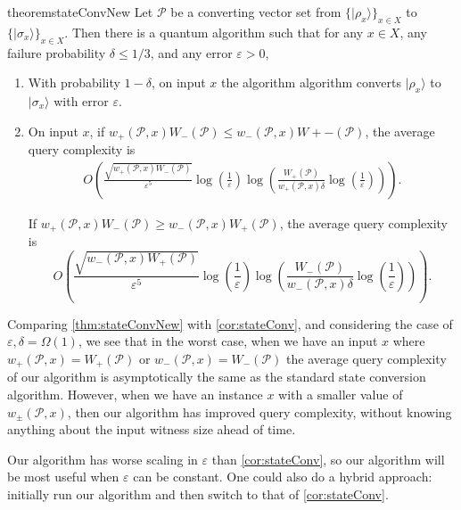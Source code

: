 \documentclass[cleveref, autoref, thm-restate,11pt]{article}
\theoremstyle{definition}
\newcommand{\ket}[1]{|#1\rangle}
\renewcommand{\wp}[2]{{w_+({#1},{#2})}}
\newcommand{\wm}[2]{{w_-({#1},{#2})}}
\begin{document}
\begin{restatable}{theorem}{stateConvNew}\label{thm:stateConvNew}
Let $\mathscr{P}$ be a converting
vector set from $\{\ket{\rho_x}\}_{x\in X}$ to $\{\ket{\sigma_x}\}_{x\in X}$. Then there is a quantum algorithm such that for any $x\in X$, any failure probability $\delta\leq 1/3$, and any error $\varepsilon>0$,
\begin{enumerate}
    \item With probability $1-\delta$, on input $x$ the algorithm algorithm converts $\ket{\rho_x}$ to $\ket{\sigma_x}$ with error $\varepsilon$.
    \item On input $x$, if $w_+(\mathscr P,x)W_-(\mathscr P)\leq w_-(\mathscr P,x)W+-(\mathscr P)$, the average query complexity is
\begin{align}
O\left(\frac{\sqrt{\wp{\mathscr P}{x}
W_-(\mathscr P)}}{\varepsilon^{5}}\log\left(\frac{1}{\varepsilon}\right)\log\left(\frac{W_+(\mathscr P)}{\wp{\mathscr P}{x}\delta}\log\left(\frac{1}{\varepsilon}\right)\right)\right).
\end{align}


     If $w_+(\mathscr P,x)W_-(\mathscr P)\geq w_-(\mathscr P,x)W_+(\mathscr P)$, the average query complexity is
     \begin{equation}
O\left(\frac{\sqrt{\wm{\mathscr P}{x}
W_+(\mathscr P)}}{\varepsilon^{5}}\log\left(\frac{1}{\varepsilon}\right)\log\left(\frac{W_-(\mathscr P)}{\wm{\mathscr P}{x}\delta}\log\left(\frac{1}{\varepsilon}\right)\right)\right).
\end{equation}
\end{enumerate}
\end{restatable}

Comparing \cref{thm:stateConvNew} with \cref{cor:stateConv}, and considering the case of  $\varepsilon,\delta=\Omega(1)$, we see that in the worst case, when we have an input $x$ where $\wp{\mathscr P}{x}=W_+(\mathscr P)$ or $\wm{\mathscr P}{x}=W_-(\mathscr P)$
 the average query complexity of our algorithm is asymptotically the same
as the standard state conversion algorithm. However, when we have an instance $x$ with a smaller value of $w_\pm(\mathscr P,x)$,
then our algorithm has improved query complexity, without knowing anything about the input witness size ahead of time.

Our algorithm has worse scaling in $\varepsilon$ than \cref{cor:stateConv}, so
our algorithm will be most useful when $\varepsilon$
can be constant. One could also do a hybrid approach: initially run
our algorithm and then switch to that of \cref{cor:stateConv}. 
\end{document}
